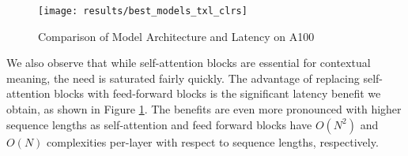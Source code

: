 \documentclass[11pt]{article}
\begin{document}
\begin{figure}
\centering
\texttt{[image: results/best\_models\_txl\_clrs]}
\caption{Comparison of Model Architecture and Latency on A100}
\label{fig:model_lat}
\end{figure}

We also observe that while self-attention blocks are essential for contextual meaning, the need is saturated fairly quickly. The advantage of replacing self-attention blocks with feed-forward blocks is the significant latency benefit we obtain, as shown in Figure \ref{fig:model_lat}. The benefits are even more pronounced with higher sequence lengths as self-attention and feed forward blocks have $O(N^{2})$ and $O(N)$ complexities per-layer with respect to sequence lengths, respectively.




\begin{table}[]
    \centering
    {}
    \captionsetup{justification=centering}
    \caption{Latency and Perplexity (PPL) of Transformer-XL Base models on WikiText-103 dataset.}
    \label{table:wiki103_results}
\end{table}
\end{document}
